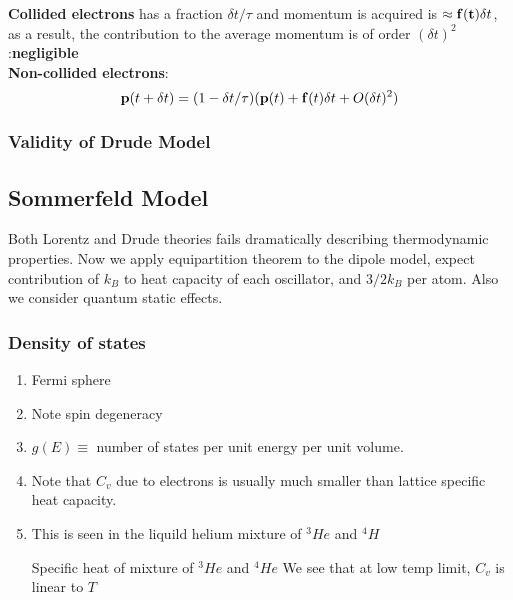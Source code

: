 \documentclass[12pt,a4paper]{article}
\begin{document}
        \indent \textbf{Collided electrons} has a fraction $\delta t/\tau$ and momentum is acquired is $\approx \vb{f(t)}\delta t$, as a result, the contribution to the average momentum is of order $(\delta t)^2$ :\textbf{negligible}\\
        \indent \textbf{Non-collided electrons}: 
        \begin{equation}
            \vb{p}(t+\delta t) = (1- \delta t/\tau)(\vb{p}(t)+\vb{f}(t)\delta t+ O(\delta t)^2)
        \end{equation}
    \subsubsection{Validity of Drude Model}
    \subsection{Sommerfeld Model}
        Both Lorentz and Drude theories fails dramatically describing thermodynamic properties. 
        Now we apply equipartition theorem to the dipole model, expect contribution of $k_B$ to heat capacity of each oscillator, and $3/2k_B$ per atom.
        Also we consider quantum static effects.
        \subsubsection{Density of states}
            \begin{enumerate}
                \item Fermi sphere
                \item Note spin degeneracy 
                \item $g(E)\equiv$ number of states per unit energy per unit volume.
                \item Note that $C_v$ due to electrons is usually much smaller than lattice specific heat capacity.
                \item {This is seen in the liquild helium mixture of ${}^{3}He$ and ${}^{4}H$
                \begin{example}
                    {Specific heat of mixture of ${}^{3}He$ and ${}^{4}He$}
                    {We see that at low temp limit, $C_v$ is linear to $T$}
                \end{example}
                }
            \end{enumerate}
\end{document}
